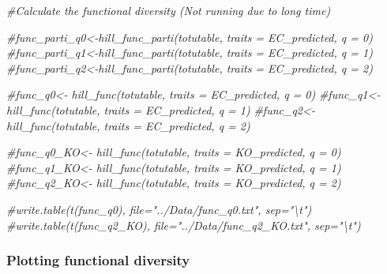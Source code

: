 \documentclass[]{interact}
\theoremstyle{plain}%
\theoremstyle{definition}
\theoremstyle{remark}
\newenvironment{Shaded}{\begin{snugshade}}{\end{snugshade}}
\newcommand{\CommentTok}[1]{\textcolor[rgb]{0.56,0.35,0.01}{\textit{#1}}}
\begin{document}
\begin{Shaded}
\begin{Highlighting}[]
\CommentTok{\#Calculate the functional diversity (Not running due to long time)}

\CommentTok{\#func\_parti\_q0\textless{}{-}hill\_func\_parti(totutable, traits = EC\_predicted, q = 0)}
\CommentTok{\#func\_parti\_q1\textless{}{-}hill\_func\_parti(totutable, traits = EC\_predicted, q = 1)}
\CommentTok{\#func\_parti\_q2\textless{}{-}hill\_func\_parti(totutable, traits = EC\_predicted, q = 2)}

\CommentTok{\#func\_q0\textless{}{-} hill\_func(totutable, traits = EC\_predicted, q = 0)}
\CommentTok{\#func\_q1\textless{}{-} hill\_func(totutable, traits = EC\_predicted, q = 1)}
\CommentTok{\#func\_q2\textless{}{-} hill\_func(totutable, traits = EC\_predicted, q = 2)}

\CommentTok{\#func\_q0\_KO\textless{}{-} hill\_func(totutable, traits = KO\_predicted, q = 0)}
\CommentTok{\#func\_q1\_KO\textless{}{-} hill\_func(totutable, traits = KO\_predicted, q = 1)}
\CommentTok{\#func\_q2\_KO\textless{}{-} hill\_func(totutable, traits = KO\_predicted, q = 2)}

\CommentTok{\#write.table(t(func\_q0), file="../Data/func\_q0.txt", sep="\textbackslash{}t")}
\CommentTok{\#write.table(t(func\_q2\_KO), file="../Data/func\_q2\_KO.txt", sep="\textbackslash{}t")}
\end{Highlighting}
\end{Shaded}

\hypertarget{plotting-functional-diversity}{%
\subsubsection{Plotting functional
diversity}\label{plotting-functional-diversity}}
\end{document}
